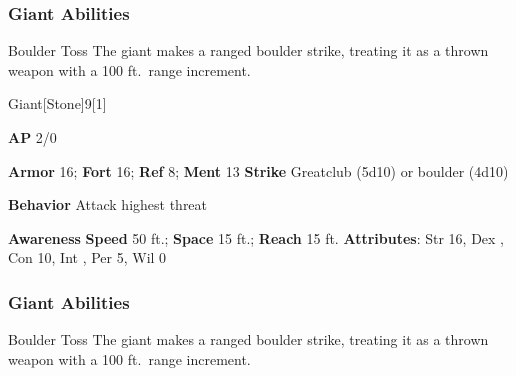 \subsubsection{Giant Abilities}

\begin{freeability}{Boulder Toss}
The giant makes a ranged boulder strike, treating it as a thrown weapon with a 100 ft.\ range increment.
\end{freeability}

\begin{monsection}{Giant}[Stone]{9}[1]
\vspace{-1em}\vspace{-1em}
\begin{spellcontent}
\begin{spelltargetinginfo}
{\textbf{AP} 2/0}

\pari \textbf{Armor} 16;
\textbf{Fort} 16;
\textbf{Ref} 8;
\textbf{Ment} 13
\pari \textbf{Strike} Greatclub  (5d10) or boulder  (4d10)



\pari \textbf{Behavior} Attack highest threat
\end{spelltargetinginfo}
\end{spellcontent}

\begin{monsterfooter}
\pari \textbf{Awareness} 
\pari \textbf{Speed} 50 ft.;
\textbf{Space} 15 ft.;
\textbf{Reach} 15 ft.
\pari \textbf{Attributes}:
Str 16,
Dex ,
Con 10,
Int ,
Per 5,
Wil 0
\end{monsterfooter}
\end{monsection}


\subsubsection{Giant Abilities}

\begin{freeability}{Boulder Toss}
The giant makes a ranged boulder strike, treating it as a thrown weapon with a 100 ft.\ range increment.
\end{freeability}

